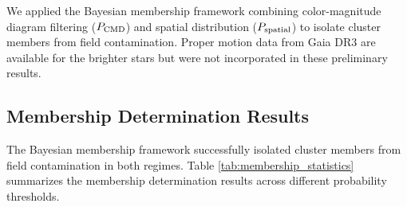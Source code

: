 \documentclass[linenumbers,trackchanges,twocolumn]{aastex701}
\begin{document}
We applied the Bayesian membership framework combining color-magnitude diagram filtering ($P_{\rm CMD}$) and spatial distribution ($P_{\rm spatial}$) to isolate cluster members from field contamination. Proper motion data from Gaia DR3 are available for the brighter stars but were not incorporated in these preliminary results.

\subsection{Membership Determination Results}

The Bayesian membership framework successfully isolated cluster members from field contamination in both regimes. Table \ref{tab:membership_statistics} summarizes the membership determination results across different probability thresholds.
\end{document}
